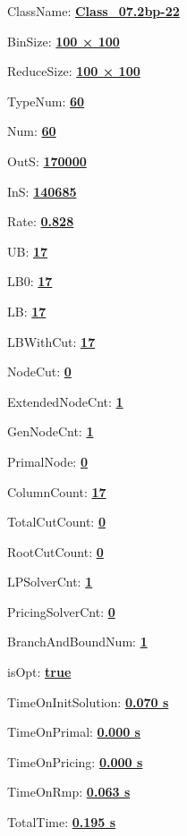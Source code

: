 \documentclass[11pt]{article}
\begin{document}
\pagestyle{empty}


ClassName: \underline{\textbf{Class_07.2bp-22}}
\par
BinSize: \underline{\textbf{100 × 100}}
\par
ReduceSize: \underline{\textbf{100 × 100}}
\par
TypeNum: \underline{\textbf{60}}
\par
Num: \underline{\textbf{60}}
\par
OutS: \underline{\textbf{170000}}
\par
InS: \underline{\textbf{140685}}
\par
Rate: \underline{\textbf{0.828}}
\par
UB: \underline{\textbf{17}}
\par
LB0: \underline{\textbf{17}}
\par
LB: \underline{\textbf{17}}
\par
LBWithCut: \underline{\textbf{17}}
\par
NodeCut: \underline{\textbf{0}}
\par
ExtendedNodeCnt: \underline{\textbf{1}}
\par
GenNodeCnt: \underline{\textbf{1}}
\par
PrimalNode: \underline{\textbf{0}}
\par
ColumnCount: \underline{\textbf{17}}
\par
TotalCutCount: \underline{\textbf{0}}
\par
RootCutCount: \underline{\textbf{0}}
\par
LPSolverCnt: \underline{\textbf{1}}
\par
PricingSolverCnt: \underline{\textbf{0}}
\par
BranchAndBoundNum: \underline{\textbf{1}}
\par
isOpt: \underline{\textbf{true}}
\par
TimeOnInitSolution: \underline{\textbf{0.070 s}}
\par
TimeOnPrimal: \underline{\textbf{0.000 s}}
\par
TimeOnPricing: \underline{\textbf{0.000 s}}
\par
TimeOnRmp: \underline{\textbf{0.063 s}}
\par
TotalTime: \underline{\textbf{0.195 s}}
\par
\newpage


\end{document}
